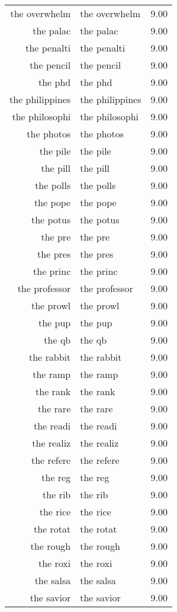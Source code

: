\begin{table}[ht]
\begin{tabular}{rlr}
  the overwhelm & the overwhelm & 9.00 \\ 
  the palac & the palac & 9.00 \\ 
  the penalti & the penalti & 9.00 \\ 
  the pencil & the pencil & 9.00 \\ 
  the phd & the phd & 9.00 \\ 
  the philippines & the philippines & 9.00 \\ 
  the philosophi & the philosophi & 9.00 \\ 
  the photos & the photos & 9.00 \\ 
  the pile & the pile & 9.00 \\ 
  the pill & the pill & 9.00 \\ 
  the polls & the polls & 9.00 \\ 
  the pope & the pope & 9.00 \\ 
  the potus & the potus & 9.00 \\ 
  the pre & the pre & 9.00 \\ 
  the pres & the pres & 9.00 \\ 
  the princ & the princ & 9.00 \\ 
  the professor & the professor & 9.00 \\ 
  the prowl & the prowl & 9.00 \\ 
  the pup & the pup & 9.00 \\ 
  the qb & the qb & 9.00 \\ 
  the rabbit & the rabbit & 9.00 \\ 
  the ramp & the ramp & 9.00 \\ 
  the rank & the rank & 9.00 \\ 
  the rare & the rare & 9.00 \\ 
  the readi & the readi & 9.00 \\ 
  the realiz & the realiz & 9.00 \\ 
  the refere & the refere & 9.00 \\ 
  the reg & the reg & 9.00 \\ 
  the rib & the rib & 9.00 \\ 
  the rice & the rice & 9.00 \\ 
  the rotat & the rotat & 9.00 \\ 
  the rough & the rough & 9.00 \\ 
  the roxi & the roxi & 9.00 \\ 
  the salsa & the salsa & 9.00 \\ 
  the savior & the savior & 9.00 \\ 

\end{tabular}
\end{table}
